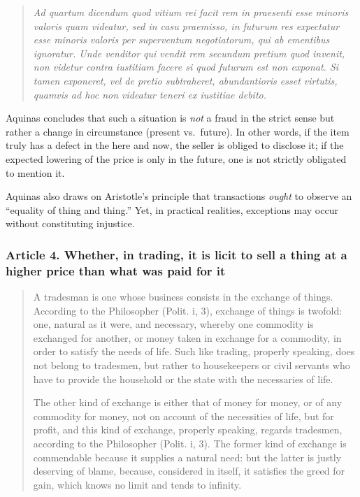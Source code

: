             \begin{quote}
                \textit{Ad quartum dicendum quod vitium rei facit rem in praesenti esse minoris valoris quam videatur, sed in casu praemisso, in futurum res expectatur esse minoris valoris per superventum negotiatorum, qui ab ementibus ignoratur. Unde venditor qui vendit rem secundum pretium quod invenit, non videtur contra iustitiam facere si quod futurum est non exponat. Si tamen exponeret, vel de pretio subtraheret, abundantioris esset virtutis, quamvis ad hoc non videatur teneri ex iustitiae debito.}
            \end{quote}
    
            \begin{remark}
            Aquinas concludes that such a situation is \emph{not} a fraud in the strict sense but rather a change in circumstance (present vs.\ future). In other words, if the item truly has a defect in the here and now, the seller is obliged to disclose it; if the expected lowering of the price is only in the future, one is not strictly obligated to mention it.
            \end{remark}
    
            Aquinas also draws on Aristotle’s principle that transactions \emph{ought} to observe an “equality of thing and thing.” Yet, in practical realities, exceptions may occur without constituting injustice.

        \subsubsection{Article 4. Whether, in trading, it is licit to sell a thing at a higher price than what was paid for it}

            \begin{quote}
                A tradesman is one whose business consists in the exchange of things. According to the Philosopher (Polit. i, 3), exchange of things is twofold: one, natural as it were, and necessary, whereby one commodity is exchanged for another, or money taken in exchange for a commodity, in order to satisfy the needs of life. Such like trading, properly speaking, does not belong to tradesmen, but rather to housekeepers or civil servants who have to provide the household or the state with the necessaries of life. 
            
                The other kind of exchange is either that of money for money, or of any commodity for money, not on account of the necessities of life, but for profit, and this kind of exchange, properly speaking, regards tradesmen, according to the Philosopher (Polit. i, 3). The former kind of exchange is commendable because it supplies a natural need: but the latter is justly deserving of blame, because, considered in itself, it satisfies the greed for gain, which knows no limit and tends to infinity.
            \end{quote}

